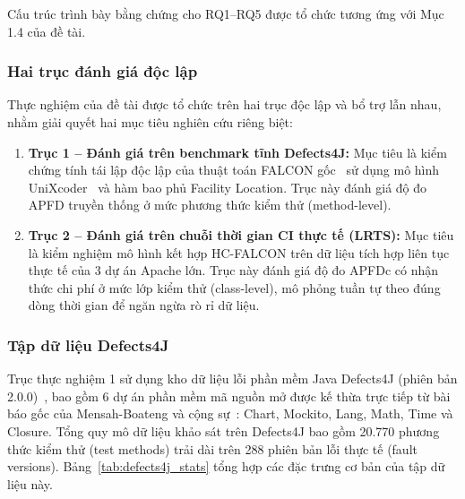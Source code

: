 Cấu trúc trình bày bằng chứng cho RQ1--RQ5 được tổ chức tương ứng với Mục 1.4 của đề tài.



\subsubsection{Hai trục đánh giá độc lập}
\label{subsubsec:two_axes}

Thực nghiệm của đề tài được tổ chức trên hai trục độc lập và bổ trợ lẫn nhau, nhằm giải quyết hai mục tiêu nghiên cứu riêng biệt:
\begin{enumerate}
    \item \textbf{Trục 1 -- Đánh giá trên benchmark tĩnh Defects4J:} Mục tiêu là kiểm chứng tính tái lập độc lập của thuật toán FALCON gốc~\cite{falcon2026} sử dụng mô hình UniXcoder~\cite{guo2022unixcoder} và hàm bao phủ Facility Location. Trục này đánh giá độ đo APFD truyền thống ở mức phương thức kiểm thử (method-level).
    \item \textbf{Trục 2 -- Đánh giá trên chuỗi thời gian CI thực tế (LRTS):} Mục tiêu là kiểm nghiệm mô hình kết hợp HC-FALCON trên dữ liệu tích hợp liên tục thực tế của 3 dự án Apache lớn. Trục này đánh giá độ đo APFDc có nhận thức chi phí ở mức lớp kiểm thử (class-level), mô phỏng tuần tự theo đúng dòng thời gian để ngăn ngừa rò rỉ dữ liệu.
\end{enumerate}

\subsubsection{Tập dữ liệu Defects4J}
\label{subsubsec:defects4j_dataset}

Trục thực nghiệm 1 sử dụng kho dữ liệu lỗi phần mềm Java Defects4J (phiên bản 2.0.0)~\cite{just2014defects4j}, bao gồm 6 dự án phần mềm mã nguồn mở được kế thừa trực tiếp từ bài báo gốc của Mensah-Boateng và cộng sự~\cite{falcon2026}: Chart, Mockito, Lang, Math, Time và Closure.
Tổng quy mô dữ liệu khảo sát trên Defects4J bao gồm 20.770 phương thức kiểm thử (test methods) trải dài trên 288 phiên bản lỗi thực tế (fault versions). Bảng~\ref{tab:defects4j_stats} tổng hợp các đặc trưng cơ bản của tập dữ liệu này.


